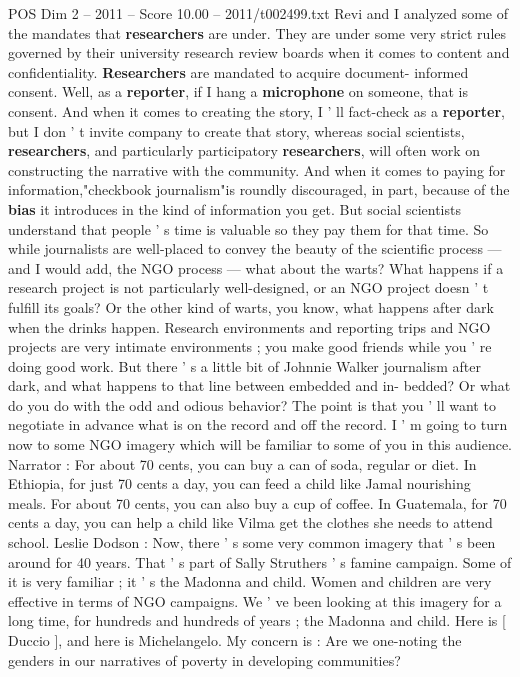 \begin{textsample}{POS Dim 2 – 2011 – Score 10.00 – 2011/t002499.txt}
Revi and I analyzed some of the mandates that \textbf{researchers} are under.
They are under some very strict rules governed by their university research review boards when it comes to content and confidentiality. \textbf{Researchers} are mandated to acquire document- informed consent.
Well, as a \textbf{reporter}, if I hang a \textbf{microphone} on someone, that is consent.
And when it comes to creating the story, I ' ll fact-check as a \textbf{reporter}, but I don ' t invite company to create that story, whereas social scientists, \textbf{researchers}, and particularly participatory \textbf{researchers}, will often work on constructing the narrative with the community.
And when it comes to paying for information,"checkbook journalism"is roundly discouraged, in part, because of the \textbf{bias} it introduces in the kind of information you get.
But social scientists understand that people ' s time is valuable so they pay them for that time.
So while journalists are well-placed to convey the beauty of the scientific process — and I would add, the NGO process — what about the warts?
What happens if a research project is not particularly well-designed, or an NGO project doesn ' t fulfill its goals?
Or the other kind of warts, you know, what happens after dark when the drinks happen.
Research environments and reporting trips and NGO projects are very intimate environments ; you make good friends while you ' re doing good work.
But there ' s a little bit of Johnnie Walker journalism after dark, and what happens to that line between embedded and in- bedded?
Or what do you do with the odd and odious behavior?
The point is that you ' ll want to negotiate in advance what is on the record and off the record.
I ' m going to turn now to some NGO imagery which will be familiar to some of you in this audience.
Narrator : For about 70 cents, you can buy a can of soda, regular or diet.
In Ethiopia, for just 70 cents a day, you can feed a child like Jamal nourishing meals.
For about 70 cents, you can also buy a cup of coffee.
In Guatemala, for 70 cents a day, you can help a child like Vilma get the clothes she needs to attend school.
Leslie Dodson : Now, there ' s some very common imagery that ' s been around for 40 years.
That ' s part of Sally Struthers ' s famine campaign.
Some of it is very familiar ; it ' s the Madonna and child.
Women and children are very effective in terms of NGO campaigns.
We ' ve been looking at this imagery for a long time, for hundreds and hundreds of years ; the Madonna and child.
Here is [ Duccio ], and here is Michelangelo.
My concern is : Are we one-noting the genders in our narratives of poverty in developing communities?

\end{textsample}

